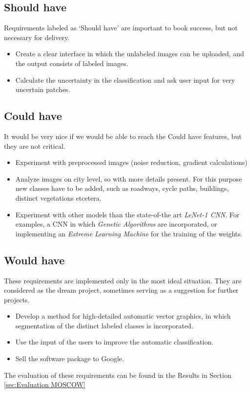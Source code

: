 \documentclass[a4paper,onecolumn]{report}
\begin{document}
\subsection{Should have}
Requirements labeled as `Should have' are important to book success, but not necessary for delivery.

\begin{itemize}
\item Create a clear interface in which the unlabeled images can be uploaded, and the output consists of labeled images. 
\item Calculate the uncertainty in the classification and ask user input for very uncertain patches.
\end{itemize}

\subsection{Could have}
It would be very nice if we would be able to reach the Could have features, but they are not critical. 
\begin{itemize}
\item Experiment with preprocessed images (noise reduction, gradient calculations)
\item Analyze images on city level, so with more details present. For this purpose new classes have to be added, such as roadways, cycle paths, 	buildings, distinct vegetations etcetera. 
\item Experiment with other models than the state-of-the art \textit{LeNet-1 CNN}. For examples, a CNN in which \textit{Genetic Algorithms} are incorporated, or implementing an \textit{Extreme Learning Machine} for the training of the weights. 
\end{itemize}

\subsection{Would have}
These requirements are implemented only in the most ideal situation. They are considered as the dream project, sometimes serving as a suggestion for further projects. 

\begin{itemize}
\item Develop a method for high-detailed automatic vector graphics, in which segmentation of the distinct labeled classes is incorporated.
\item Use the input of the users to improve the automatic classification. 
\item Sell the software package to Google. 
\end{itemize}
The evaluation of these requirements can be found in the Results in Section \ref{sec:Evaluation MOSCOW}
\end{document}
